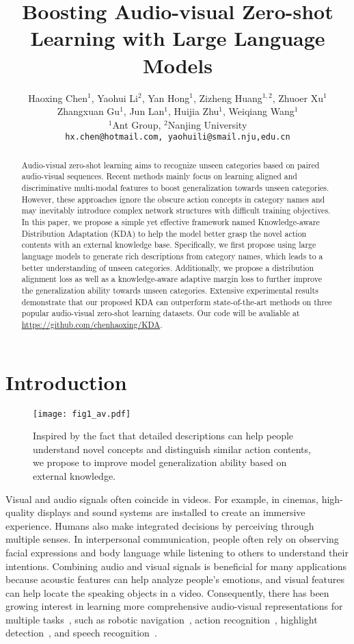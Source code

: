 \documentclass[10pt,twocolumn,letterpaper]{article}
\title{Boosting Audio-visual Zero-shot Learning with Large Language Models}
\author{Haoxing Chen$^{1}$, Yaohui Li$^{2}$, Yan Hong$^{1}$, Zizheng Huang$^{1,2}$, Zhuoer Xu$^{1}$\\  Zhangxuan Gu$^{1}$, Jun Lan$^{1}$, Huijia Zhu$^{1}$, Weiqiang Wang$^{1}$\\
$^{1}$Ant Group, $^{2}$Nanjing University\\
{\tt\small hx.chen@hotmail.com, yaohuili@smail.nju,edu.cn}}
\begin{document}
\maketitle

\begin{abstract}
Audio-visual zero-shot learning aims to recognize unseen categories based on paired audio-visual sequences. Recent methods mainly focus on learning aligned and discriminative multi-modal features to boost generalization towards unseen categories. However, these approaches ignore the obscure action concepts in category names and may inevitably introduce complex network structures with difficult training objectives. In this paper, we propose a simple yet effective framework named Knowledge-aware Distribution Adaptation (KDA) to help the model better grasp the novel action contents with an external knowledge base. Specifically, we first propose using large language models to generate rich descriptions from category names, which leads to a better understanding of unseen categories. Additionally, we propose a distribution alignment loss as well as a knowledge-aware adaptive margin loss to further improve the generalization ability towards unseen categories. Extensive experimental results demonstrate that our proposed KDA can outperform state-of-the-art methods on three popular audio-visual zero-shot learning datasets. Our code will be avaliable at \url{https://github.com/chenhaoxing/KDA}.

\end{abstract}

\section{Introduction}
\begin{figure}[t]
	\centering
	\texttt{[image: fig1\_av.pdf]}
	\caption{Inspired by the fact that detailed descriptions can help people understand novel concepts and distinguish similar action contents, we propose to improve model generalization ability based on external knowledge.}
	\label{motivation}
\end{figure}
Visual and audio signals often coincide in videos. For example, in cinemas, high-quality displays and sound systems are installed to create an immersive experience. 
Humans also make integrated decisions by perceiving through multiple senses. 
In interpersonal communication, people often rely on observing facial expressions and body language while listening to others to understand their intentions.
Combining audio and visual signals is beneficial for many applications because acoustic features can help analyze people's emotions, and visual features can help locate the speaking objects in a video.
Consequently, there has been growing interest in learning more comprehensive audio-visual representations for multiple tasks~\cite{CASP-Net,egoav,AVFace,MIR-GAN}, such as robotic navigation~\cite{avms,AVLEN}, action recognition~\cite{CAAV}, highlight detection~\cite{JVAVHD}, and speech recognition~\cite{MIR-GAN}.
\end{document}
